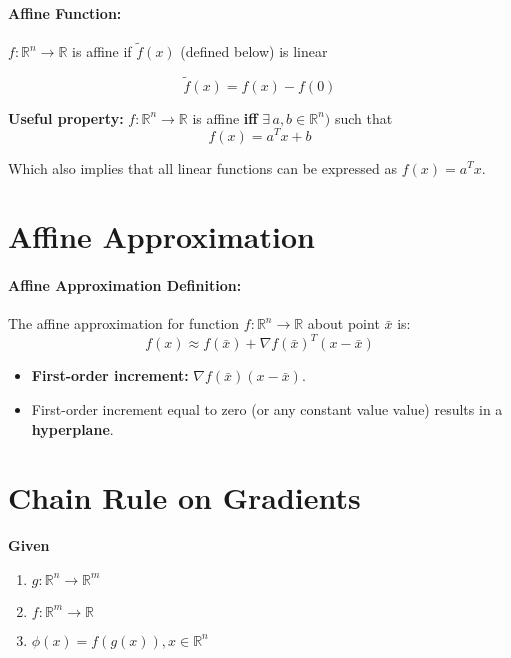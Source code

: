 \documentclass[a4paper,12pt]{report}
\def\reals{\mathbb{R}}
\begin{document}
\paragraph{Affine Function: } $f: \reals^n \to \reals$ is affine if $\tilde f(x)$ (defined below) is linear

\begin{equation}
\tilde f(x) = f(x) - f(0)
\end{equation}

\textbf{Useful property: } $f:\reals^n\to\reals$ is affine \textbf{iff} $\exists\, a,b \in \reals^n)$ such that\begin{equation}
f(x) = a^T x + b
\end{equation}

Which also implies that all linear functions can be expressed as $f(x) = a^T x$.

\section{Affine Approximation}

\paragraph{Affine Approximation Definition: } The affine approximation for function $f:\reals^n\to\reals$ about point $\bar{x}$ is: \begin{equation}
f(x) \approx f(\bar{x}) + \nabla f(\bar{x})^T(x-\bar{x}) 
\end{equation}

\begin{itemize}
\item \textbf{First-order increment: } $\nabla f(\bar{x})(x-\bar{x})$.
\item First-order increment equal to zero (or any constant value value) results in a \textbf{hyperplane}.
\end{itemize}

\section{Chain Rule on Gradients}

\textbf{Given } 
\begin{enumerate}
\item $g:\reals^n\to\reals^m$
\item $f:\reals^m\to\reals$
\item $\phi(x) = f(g(x)), x\in\reals^n$
\end{enumerate}
\end{document}
